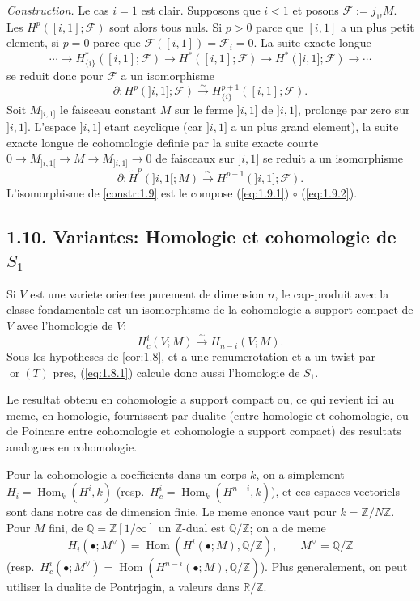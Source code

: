 \documentclass[11pt,a4paper]{article}
\theoremstyle{plain}
\theoremstyle{definition}
\DeclareMathOperator{\Hom}{Hom}
\newcommand{\ori}{\operatorname{or}}
\begin{document}
\noindent\textit{Construction.} Le cas $i = 1$ est clair. Supposons que $i < 1$ et posons $\mathcal{F} := j_{1!}M$. Les $H^p([i,1];\mathcal{F})$ sont alors tous nuls. Si $p > 0$ parce que $[i,1]$ a un plus petit element, si $p = 0$ parce que $\mathcal{F}([i,1]) = \mathcal{F}_i = 0$. La suite exacte longue
\[\cdots \to H^*_{\{i\}}([i,1];\mathcal{F}) \to H^*([i,1];\mathcal{F}) \to H^*(]i,1];\mathcal{F}) \to \cdots\]
se reduit donc pour $\mathcal{F}$ a un isomorphisme
\begin{equation}\label{eq:1.9.1}
\partial: H^p(]i,1];\mathcal{F}) \xrightarrow{\sim} H^{p+1}_{\{i\}}([i,1];\mathcal{F}).
\tag{1.9.1}
\end{equation}
Soit $M_{]i,1]}$ le faisceau constant $M$ sur le ferme $]i,1]$ de $]i,1]$, prolonge par zero sur $]i,1]$. L'espace $]i,1]$ etant acyclique (car $]i,1]$ a un plus grand element), la suite exacte longue de cohomologie definie par la suite exacte courte $0 \to M_{]i,1[} \to M \to M_{]i,1]} \to 0$ de faisceaux sur $]i,1]$ se reduit a un isomorphisme
\begin{equation}\label{eq:1.9.2}
\partial: \widetilde{H}^p(]i,1[;M) \xrightarrow{\sim} H^{p+1}(]i,1];\mathcal{F}).
\tag{1.9.2}
\end{equation}
L'isomorphisme de \ref{constr:1.9} est le compose (\ref{eq:1.9.1}) $\circ$ (\ref{eq:1.9.2}).

\subsection{1.10. Variantes: Homologie et cohomologie de $S_1$}\label{subsec:1.10}

Si $V$ est une variete orientee purement de dimension $n$, le cap-produit avec la classe fondamentale est un isomorphisme de la cohomologie a support compact de $V$ avec l'homologie de $V$:
\[H^i_c(V;M) \xrightarrow{\sim} H_{n-i}(V;M).\]
Sous les hypotheses de \ref{cor:1.8}, et a une renumerotation et a un twist par $\ori(T)$ pres, (\ref{eq:1.8.1}) calcule donc aussi l'homologie de $S_1$.

Le resultat obtenu en cohomologie a support compact ou, ce qui revient ici au meme, en homologie, fournissent par dualite (entre homologie et cohomologie, ou de Poincare entre cohomologie et cohomologie a support compact) des resultats analogues en cohomologie.

Pour la cohomologie a coefficients dans un corps $k$, on a simplement $H_i = \Hom_k(H^i,k)$ (resp.~$H^i_c = \Hom_k(H^{n-i},k)$), et ces espaces vectoriels sont dans notre cas de dimension finie. Le meme enonce vaut pour $k = \mathbb{Z}/N\mathbb{Z}$. Pour $M$ fini, de $\mathbb{Q} = \mathbb{Z}[1/\infty]$ un $\mathbb{Z}$-dual est $\mathbb{Q}/\mathbb{Z}$; on a de meme
\[H_i(\bullet;M^\vee) = \Hom(H^i(\bullet;M),\mathbb{Q}/\mathbb{Z}), \qquad M^\vee = \mathbb{Q}/\mathbb{Z}\]
(resp.~$H^i_c(\bullet;M^\vee) = \Hom(H^{n-i}(\bullet;M),\mathbb{Q}/\mathbb{Z})$). Plus generalement, on peut utiliser la dualite de Pontrjagin, a valeurs dans $\mathbb{R}/\mathbb{Z}$.
\end{document}
